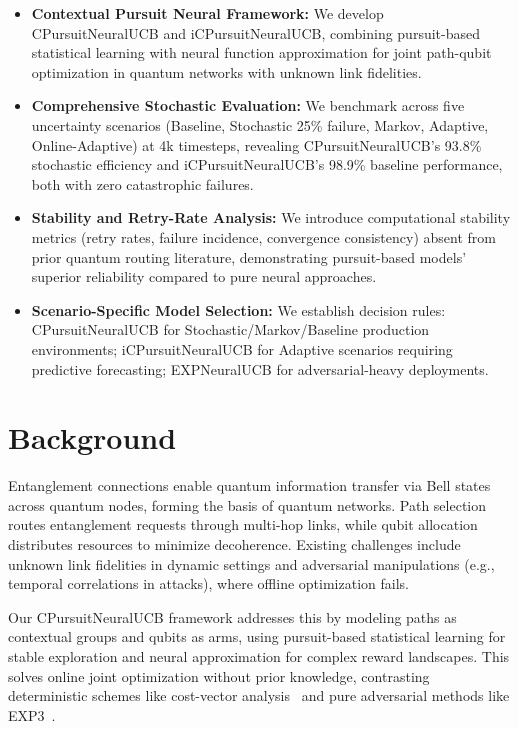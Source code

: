 \documentclass[sigconf,anonymous,review,natbib=false]{acmart}
\newcommand{\descStep}[2]{\noindent \textbf{#1: } #2}
\begin{document}
\begin{itemize}[leftmargin=2em]

    \item \descStep{Contextual Pursuit Neural Framework}{We develop CPursuitNeuralUCB and iCPursuitNeuralUCB, combining pursuit-based statistical learning with neural function approximation for joint path-qubit optimization in quantum networks with unknown link fidelities.}
    \item \descStep{Comprehensive Stochastic Evaluation}{We benchmark across five uncertainty scenarios (Baseline, Stochastic 25\% failure, Markov, Adaptive, Online-Adaptive) at 4k timesteps, revealing CPursuitNeuralUCB's 93.8\% stochastic efficiency and iCPursuitNeuralUCB's 98.9\% baseline performance, both with zero catastrophic failures.}
    \item \descStep{Stability and Retry-Rate Analysis}{We introduce computational stability metrics (retry rates, failure incidence, convergence consistency) absent from prior quantum routing literature, demonstrating pursuit-based models' superior reliability compared to pure neural approaches.}
    \item \descStep{Scenario-Specific Model Selection}{We establish decision rules: CPursuitNeuralUCB for Stochastic/Markov/Baseline production environments; iCPursuitNeuralUCB for Adaptive scenarios requiring predictive forecasting; EXPNeuralUCB for adversarial-heavy deployments.}

\end{itemize}




\section{Background} 
\label{sec: Background}

Entanglement connections enable quantum information transfer via Bell states across quantum nodes, forming the basis of quantum networks. Path selection routes entanglement requests through multi-hop links, while qubit allocation distributes resources to minimize decoherence. Existing challenges include unknown link fidelities in dynamic settings and adversarial manipulations (e.g., temporal correlations in attacks), where offline optimization fails.

Our CPursuitNeuralUCB framework addresses this by modeling paths as contextual groups and qubits as arms, using pursuit-based statistical learning for stable exploration and neural approximation for complex reward landscapes. This solves online joint optimization without prior knowledge, contrasting deterministic schemes like cost-vector analysis~\cite{smith2024costvector} and pure adversarial methods like EXP3~\cite{jie2024expneuralucb}.
\end{document}
